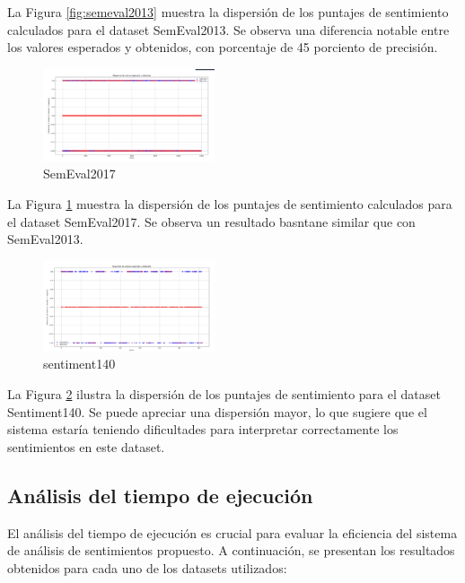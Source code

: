 \documentclass[sigconf, review=false, nonacm]{acmart}
\begin{document}
La Figura \ref{fig:semeval2013} muestra la dispersión de los puntajes de sentimiento calculados para el dataset SemEval2013.
Se observa una diferencia notable entre los valores esperados y obtenidos, con porcentaje de 45 porciento de precisión.

\begin{figure}[H]
	\centering
	\includegraphics[width=0.45\textwidth]{../results/dispersion/semeval2017.png}
	\caption{SemEval2017}
	\label{fig:semeval2017}
\end{figure}

La Figura \ref{fig:semeval2017} muestra la dispersión de los puntajes de sentimiento calculados para el dataset SemEval2017.
Se observa un resultado basntane similar que con SemEval2013.

\begin{figure}[H]
	\centering
	\includegraphics[width=0.45\textwidth]{../results/dispersion/sentiment140.png}
	\caption{sentiment140}
	\label{fig:sentiment140}
\end{figure}

La Figura \ref{fig:sentiment140} ilustra la dispersión de los puntajes de sentimiento para el dataset Sentiment140.
Se puede apreciar una dispersión mayor, lo que sugiere que el sistema estaría teniendo
dificultades para interpretar correctamente los sentimientos en este dataset.

\subsection{Análisis del tiempo de ejecución}
El análisis del tiempo de ejecución es crucial para evaluar la eficiencia del sistema
de análisis de sentimientos propuesto. A continuación, se presentan los resultados obtenidos
para cada uno de los datasets utilizados:
\end{document}
